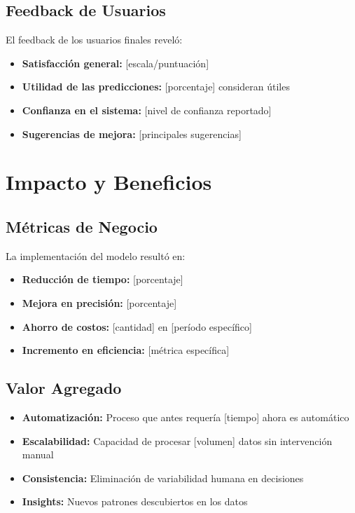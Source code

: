 \subsection{Feedback de Usuarios}

El feedback de los usuarios finales reveló:

\begin{itemize}
    \item \textbf{Satisfacción general:} [escala/puntuación]
    \item \textbf{Utilidad de las predicciones:} [porcentaje] consideran útiles
    \item \textbf{Confianza en el sistema:} [nivel de confianza reportado]
    \item \textbf{Sugerencias de mejora:} [principales sugerencias]
\end{itemize}

\section{Impacto y Beneficios}

\subsection{Métricas de Negocio}

La implementación del modelo resultó en:

\begin{itemize}
    \item \textbf{Reducción de tiempo:} [porcentaje]%
    \item \textbf{Mejora en precisión:} [porcentaje]%
    \item \textbf{Ahorro de costos:} [cantidad] en [período específico]
    \item \textbf{Incremento en eficiencia:} [métrica específica]
\end{itemize}

\subsection{Valor Agregado}

\begin{itemize}
    \item \textbf{Automatización:} Proceso que antes requería [tiempo] ahora es automático
    \item \textbf{Escalabilidad:} Capacidad de procesar [volumen] datos sin intervención manual
    \item \textbf{Consistencia:} Eliminación de variabilidad humana en decisiones
    \item \textbf{Insights:} Nuevos patrones descubiertos en los datos
\end{itemize}

